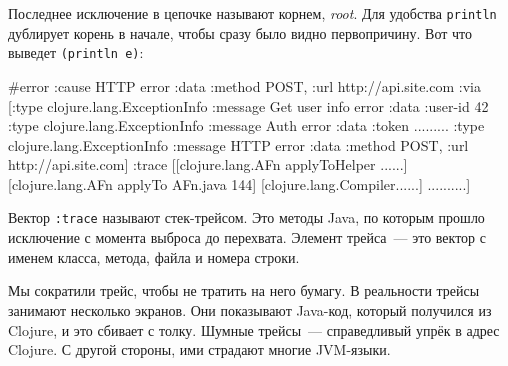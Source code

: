 Последнее исключение в цепочке называют корнем, \emph{root}. Для удобства
\verb|println| дублирует корень в начале, чтобы сразу было видно
первопричину. Вот что выведет \verb|(println e)|:


\ifx\DEVICETYPE\MOBILE

\begin{english}
  \begin{clojure}
#error {
 :cause HTTP error
 :data {:method POST,
        :url http://api.site.com}
 :via
 [{:type clojure.lang.ExceptionInfo
   :message Get user info error
   :data {:user-id 42}}
  {:type clojure.lang.ExceptionInfo
   :message Auth error
   :data {:token .........}}
  {:type clojure.lang.ExceptionInfo
   :message HTTP error
   :data {:method POST,
          :url http://api.site.com}}]
 :trace
 [[clojure.lang.AFn applyToHelper ......]
  [clojure.lang.AFn applyTo AFn.java 144]
  [clojure.lang.Compiler......]
  ..........]}
  \end{clojure}
\end{english}

\else

\begin{english}
\end{english}

\fi


Вектор \verb|:trace| называют стек-трейсом. Это методы Java, по которым прошло
исключение с момента выброса до перехвата. Элемент трейса~--- это вектор с именем
класса, метода, файла и номера строки.

Мы сократили трейс, чтобы не тратить на него бумагу. В реальности трейсы
занимают несколько экранов. Они показывают Java-код, который получился из
Clojure, и это сбивает с толку. Шумные трейсы~--- справедливый упрёк в адрес
Clojure. С другой стороны, ими страдают многие JVM-языки.


